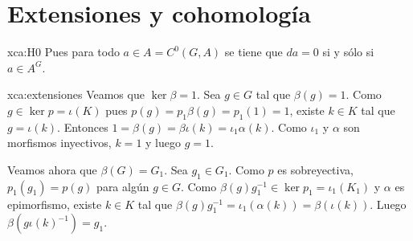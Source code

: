 \section*{Extensiones y cohomología}

\begin{sol}{xca:H0}
	Pues para todo $a\in A=C^0(G,A)$ se tiene que $da=0$ si y sólo si $a\in
	A^G$.
\end{sol}

\begin{sol}{xca:extensiones}
	Veamos que $\ker\beta=1$. Sea $g\in G$ tal que $\beta(g)=1$. Como $g\in\ker
	p=\iota(K)$ pues $p(g)=p_1\beta(g)=p_1(1)=1$, existe $k\in K$ tal que
	$g=\iota(k)$. Entonces $1=\beta(g)=\beta\iota(k)=\iota_1\alpha(k)$. Como
	$\iota_1$ y $\alpha$ son morfismos inyectivos, $k=1$ y luego $g=1$.
	
	Veamos ahora que $\beta(G)=G_1$. Sea $g_1\in G_1$. Como $p$ es
	sobreyectiva, $p_1(g_1)=p(g)$ para algún $g\in G$. Como
	$\beta(g)g_1^{-1}\in \ker p_1=\iota_1(K_1)$ y $\alpha$ es epimorfismo,
	existe $k\in K$ tal que
	$\beta(g)g_1^{-1}=\iota_1(\alpha(k))=\beta(\iota(k))$. Luego
	$\beta(g\iota(k)^{-1})=g_1$.
\end{sol}
